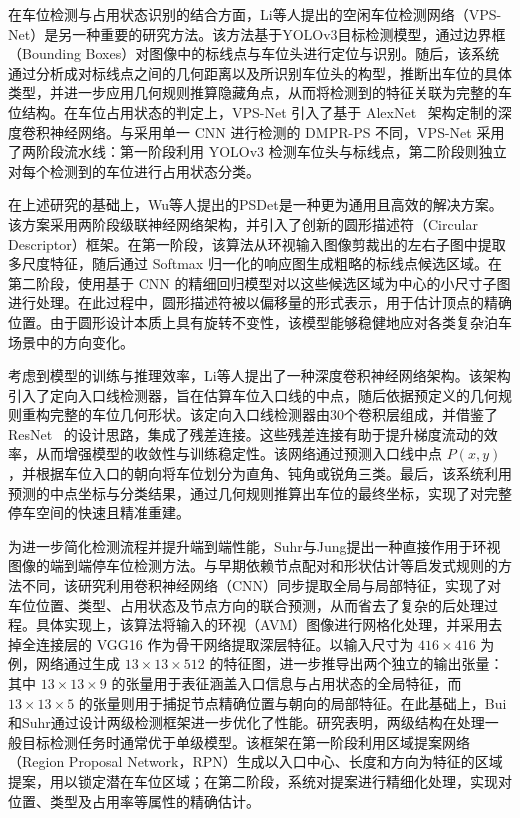 在车位检测与占用状态识别的结合方面，Li等人\cite{li2020vacant}提出的空闲车位检测网络（VPS-Net）是另一种重要的研究方法。该方法基于YOLOv3\cite{redmon2018yolov3}目标检测模型，通过边界框（Bounding Boxes）对图像中的标线点与车位头进行定位与识别。随后，该系统通过分析成对标线点之间的几何距离以及所识别车位头的构型，推断出车位的具体类型，并进一步应用几何规则推算隐藏角点，从而将检测到的特征关联为完整的车位结构。在车位占用状态的判定上，VPS-Net 引入了基于 AlexNet~\cite{krizhevsky2012imagenet} 架构定制的深度卷积神经网络。与采用单一 CNN 进行检测的 DMPR-PS 不同，VPS-Net 采用了两阶段流水线：第一阶段利用 YOLOv3 检测车位头与标线点，第二阶段则独立对每个检测到的车位进行占用状态分类。

在上述研究的基础上，Wu等人\cite{wu2020psdet}提出的PSDet是一种更为通用且高效的解决方案。该方案采用两阶段级联神经网络架构，并引入了创新的圆形描述符（Circular Descriptor）框架。在第一阶段，该算法从环视输入图像剪裁出的左右子图中提取多尺度特征，随后通过 Softmax 归一化的响应图生成粗略的标线点候选区域。在第二阶段，使用基于 CNN 的精细回归模型对以这些候选区域为中心的小尺寸子图进行处理。在此过程中，圆形描述符被以偏移量的形式表示，用于估计顶点的精确位置。由于圆形设计本质上具有旋转不变性，该模型能够稳健地应对各类复杂泊车场景中的方向变化。

考虑到模型的训练与推理效率，Li等人\cite{li2020parking}提出了一种深度卷积神经网络架构。该架构引入了定向入口线检测器，旨在估算车位入口线的中点，随后依据预定义的几何规则重构完整的车位几何形状。该定向入口线检测器由30个卷积层组成，并借鉴了 ResNet~\cite{kaiming2016deep} 的设计思路，集成了残差连接。这些残差连接有助于提升梯度流动的效率，从而增强模型的收敛性与训练稳定性。该网络通过预测入口线中点 $P(x,y)$，并根据车位入口的朝向将车位划分为直角、钝角或锐角三类。最后，该系统利用预测的中点坐标与分类结果，通过几何规则推算出车位的最终坐标，实现了对完整停车空间的快速且精准重建。

为进一步简化检测流程并提升端到端性能，Suhr与Jung\cite{suhr2021end}提出一种直接作用于环视图像的端到端停车位检测方法。与早期依赖节点配对和形状估计等启发式规则的方法不同，该研究利用卷积神经网络（CNN）同步提取全局与局部特征，实现了对车位位置、类型、占用状态及节点方向的联合预测，从而省去了复杂的后处理过程。具体实现上，该算法将输入的环视（AVM）图像进行网格化处理，并采用去掉全连接层的 VGG16 作为骨干网络提取深层特征。以输入尺寸为 $416\times416$ 为例，网络通过生成 $13\times13\times512$ 的特征图，进一步推导出两个独立的输出张量：其中 $13\times13\times9$ 的张量用于表征涵盖入口信息与占用状态的全局特征，而 $13\times13\times5$ 的张量则用于捕捉节点精确位置与朝向的局部特征。在此基础上，Bui和Suhr\cite{bui2023cnn}通过设计两级检测框架进一步优化了性能。研究表明，两级结构在处理一般目标检测任务时通常优于单级模型。该框架在第一阶段利用区域提案网络（Region Proposal Network，RPN）生成以入口中心、长度和方向为特征的区域提案，用以锁定潜在车位区域；在第二阶段，系统对提案进行精细化处理，实现对位置、类型及占用率等属性的精确估计。


